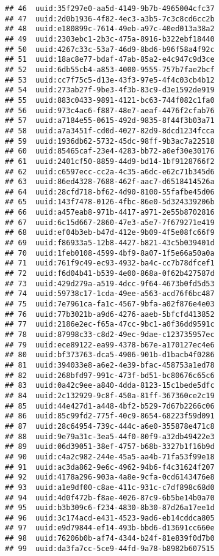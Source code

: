 \documentclass[
]{article}
\begin{document}
\begin{verbatim}
## 46  uuid:35f297e0-aa5d-4149-9b7b-4965004cfc37
## 47  uuid:2d0b1936-4f82-4ec3-a3b5-7c3c8cd6cc2b
## 48  uuid:e180899c-7614-49eb-a97c-40ed013a38a2
## 49  uuid:2303ebc1-2b3c-475a-8916-b322ebf18440
## 50  uuid:4267c33c-53a7-46d9-8bd6-b96f58a4f92c
## 51  uuid:18ac8e77-bdaf-47ab-85a2-e4c947c9d3ce
## 52  uuid:6db55cb4-a853-4000-9555-757b7fae2bcf
## 53  uuid:cc7f75c5-d13e-43f3-97e5-4f4c03cb4b12
## 54  uuid:273ab27f-9be3-4f3b-83c9-d3e1592de919
## 55  uuid:883c0433-9891-4121-bc63-744f082c1fa0
## 56  uuid:973c4ac6-f887-48e7-aeaf-4476f2cfab76
## 57  uuid:a7184e55-0615-492d-9835-8f44f3b03a71
## 58  uuid:a7a3451f-cd0d-4027-82d9-8dcd1234fcca
## 59  uuid:1936db62-5732-45dc-98ff-9b3ac7a22518
## 60  uuid:85465caf-23e4-4283-bb72-a0ef30e30176
## 61  uuid:2401cf50-8859-44d9-bd14-1bf9128766f2
## 62  uuid:c6597ecc-cc2a-4c35-a6dc-e62c71b345d6
## 63  uuid:86ed4328-7688-462f-aac7-d6518414526a
## 64  uuid:28cfd718-bf62-4d90-8100-55fafbe45d06
## 65  uuid:143f7478-0126-4fbc-86e0-5d324339206b
## 66  uuid:a457eab8-971b-4417-a971-2e55b8702816
## 67  uuid:6c15d667-2860-47e3-a5e7-7f679271e419
## 68  uuid:ef04b3eb-b47d-412e-9b09-4f5e08fc66f9
## 69  uuid:f86933a5-12b8-4427-b821-43c5b039401d
## 70  uuid:1feb0108-4599-4bf9-8a07-1f5e66a50a0a
## 71  uuid:761f9c49-ec93-4932-ba4c-cc7b78dfcef1
## 72  uuid:f6d04b41-b539-4e00-868a-0f62b427587d
## 73  uuid:429d279a-a519-4dcc-9f64-4673b0fd5d53
## 74  uuid:59738c17-1cda-49ee-a563-acd76f6bc487
## 75  uuid:7e7961ca-fa1c-4567-9bfa-a02f876e4e03
## 76  uuid:77b3021b-a9d6-4276-aaeb-5bfcfd413852
## 77  uuid:2186e2ec-f65a-47cc-9bc1-a0f36dd9591c
## 78  uuid:87998c33-c8d2-49ec-9dae-c123735957ec
## 79  uuid:ece89122-ea99-4378-b67e-a170127ec4e6
## 80  uuid:bf373763-dca5-4906-901b-d1bacb4f0286
## 81  uuid:394033e8-a6e2-4e39-bfac-458753a1ed78
## 82  uuid:268bfd97-991c-473f-bd51-bc80676c65c6
## 83  uuid:0a42c9ee-a840-4dda-8123-15c1bede5dfc
## 84  uuid:2c132929-9c8f-450a-81ff-367360ce2c19
## 85  uuid:44e427d1-a448-4bf2-b529-7d67b2266c06
## 86  uuid:85c99fd2-775f-40c9-8654-68223f59d091
## 87  uuid:28c64954-739c-444c-a6e0-355878e471c8
## 88  uuid:9e79a31c-3ea5-44f0-80f9-a32db49422e3
## 89  uuid:06d39051-38ef-4757-b68b-3327b1f16b9d
## 90  uuid:c4a2c982-244e-45a5-aa4b-71fa53f99e18
## 91  uuid:ac3da862-9e6c-4962-94b6-f4c31624f207
## 92  uuid:4178a296-903a-4a8e-9cfa-0cd6143476e8
## 93  uuid:a1e9df00-c8ae-411c-931c-c7df898c68d0
## 94  uuid:4d0f472b-f8ae-4026-87c9-6b5be14b0a70
## 95  uuid:b3b309c6-f234-4830-8b30-87d26a17ee1d
## 96  uuid:3c174acd-e431-4523-9ad6-eb14cddca805
## 97  uuid:e9d79844-ef14-493b-bbd6-d13691cc660e
## 98  uuid:76206b0b-af74-4344-b24f-81e839f0d7b0
## 99  uuid:da3fa7cc-5ce9-44fd-9a78-b8982b607515

\end{verbatim}
\end{document}
